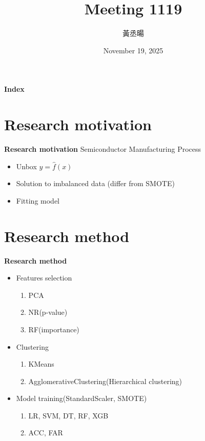 \documentclass[12pt,aspectratio=43]{beamer}
\title{Meeting 1119}
\author{黃丞暘}
\institute{國立東華大學應數統計所}
\date{November 19, 2025}
\begin{document}
\begin{frame}
  \titlepage
\end{frame}

\begin{frame}{\textbf{Index}}
  \tableofcontents
\end{frame}

\section{Research motivation}

\begin{frame}{\textbf{Research motivation}}
\linespread{1.5}
  Semiconductor Manufacturing Process
  \begin{itemize}
    \item Unbox $y = \hat{f}(x)$
  \end{itemize}
  \begin{itemize}
    \item Solution to imbalanced data (differ from SMOTE)
  \end{itemize}
  \begin{itemize}
    \item Fitting model
  \end{itemize}
\end{frame}

\section{Research method}

\begin{frame}{\textbf{Research method}}
\linespread{1.5}
  \begin{itemize}[]
    \item Features selection
      \begin{enumerate}[]
        \item PCA
        \item NR(p-value)
        \item RF(importance)
      \end{enumerate}
    \item Clustering
      \begin{enumerate}[]
        \item KMeans
        \item AgglomerativeClustering(Hierarchical clustering)
      \end{enumerate}
    \item Model training(StandardScaler, SMOTE)
      \begin{enumerate}
        \item LR, SVM, DT, RF, XGB
        \item ACC, FAR
      \end{enumerate}
  \end{itemize}
\end{frame}
\end{document}
